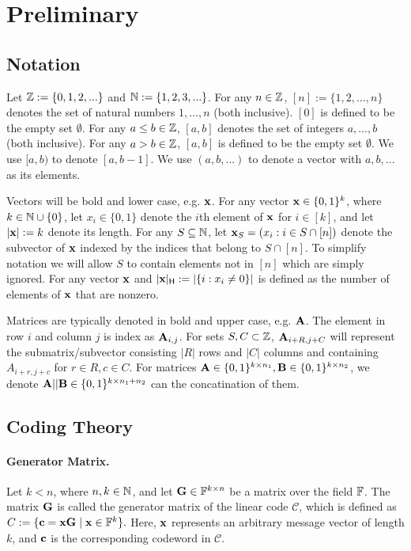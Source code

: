 \section{Preliminary}


\subsection{Notation}\label{ssec:not}

Let $\mathbb{Z}:=\{0,1,2,...\}$ and $\mathbb{N}:=\{1,2,3,...\}$.
For any $n \in \mathbb{Z}$, $[n] := \{1, 2, \ldots, n\}$ denotes the set of natural numbers $1, \ldots, n$ (both inclusive). $[0]$ is defined to be the empty set $\emptyset$. For any $a \le b \in \mathbb{Z}$, $[a,b]$ denotes the set of integers $a, \ldots, b$ (both inclusive). For any $a > b \in \mathbb{Z}$, $[a,b]$ is defined to be the empty set $\emptyset$. We use $[a,b)$ to denote $[a,b-1]$. We use $(a,b,...)$ to denote a vector with $a,b,...$ as its elements. 
 
Vectors will be bold and lower case, e.g. $\mathbf{x}$.
For any vector $\mathbf{x} \in \{0,1\}^k$, where $k \in \mathbb{N}\cup\{0\}$, let $x_i\in\{0,1\}$ denote the $i$th element of $\mathbf{x}$ for $i \in [k]$, and let $|\mathbf{x}| := k$ denote its length. For any $S\subseteq \mathbb{N}$, let $\mathbf{x}_{S} = (x_i:i\in S\cap [n])$ denote the subvector of $\mathbf{x}$ indexed by the indices that belong to $S\cap [n]$. To simplify notation we will allow $S$ to contain elements not in $[n]$ which are simply ignored. 
For any vector $\mathbf{x}$ and $|\mathbf{x}|_\mathsf{H} := |\{i:x_i\neq 0\}|$ is defined as the number of elements of $\mathbf{x}$ that are  nonzero.


Matrices are typically denoted in bold and upper case, e.g. $\mathbf{A}$. The element in row $i$ and column $j$ is index as $\mathbf{A}_{i,j}$. For sets $S,C\subset \mathbb{Z}$, $\mathbf{A}_{i+R,j+C}$ will represent the submatrix/subvector consisting $|R|$ rows and $|C|$ columns and containing $A_{i+r,j+c}$ for $r\in R,c\in C$. For matrices $\mathbf{A}\in \{0,1\}^{k\times n_1},\mathbf{B}\in \{0,1\}^{k\times n_2}$, we denote $\mathbf{A}||\mathbf{B}\in \{0,1\}^{k\times n_1+n_2}$ can the concatination of them. 

 \subsection{Coding Theory}\label{ssec:codingtheory}

\paragraph{Generator Matrix.}
Let $k < n$, where $n,k\in\mathbb{N}$, and let $\mathbf{G}\in\mathbb{F}^{k\times n}$ be a matrix over the field $\mathbb{F}$. The matrix $\mathbf{G}$ is called the generator matrix of the linear code $\mathcal{C}$, which is defined as
\(
C := \{ \mathbf{c} = \mathbf{x}\mathbf{G} \mid \mathbf{x} \in \mathbb{F}^k \}.
\)
Here, $\mathbf{x}$ represents an arbitrary message vector of length $k$, and $\mathbf{c}$ is the corresponding codeword in $\mathcal{C}$.


